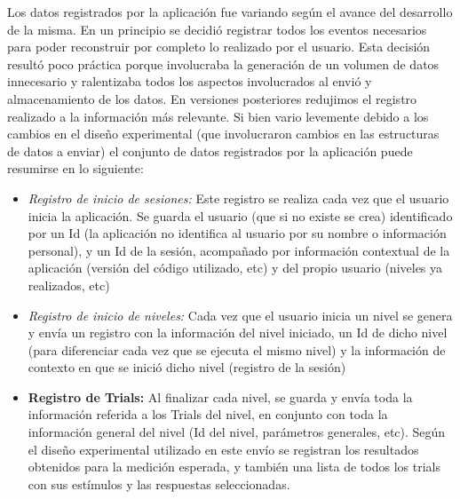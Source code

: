 \documentclass{article}
\begin{document}
    Los datos registrados por la aplicación fue variando según el avance del desarrollo de la misma. En un principio se decidió registrar todos los eventos necesarios para poder reconstruir por completo lo realizado por el usuario. Esta decisión resultó poco práctica porque involucraba la generación de un volumen de datos innecesario y ralentizaba todos los aspectos involucrados al envió y almacenamiento de los datos. 
    En versiones posteriores redujimos el registro realizado a la información más relevante. Si bien vario levemente debido a los cambios en el diseño experimental (que involucraron cambios en las estructuras de datos a enviar) el conjunto de datos registrados por la aplicación puede resumirse en lo siguiente:
    \begin{itemize}
        \item \textit{Registro de inicio de sesiones:} Este registro se realiza cada vez que el usuario inicia la aplicación. Se guarda el usuario (que si no existe se crea) identificado por un Id (la aplicación no identifica al usuario por su nombre o información personal), y un Id de la sesión, acompañado por información contextual de la aplicación (versión del código utilizado, etc) y del propio usuario (niveles ya realizados, etc)
        
        \item \textit{Registro de inicio de niveles:} Cada vez que el usuario inicia un nivel se genera y envía un registro con la información del nivel iniciado, un Id de dicho nivel (para diferenciar cada vez que se ejecuta el mismo nivel) y la información de contexto en que se inició dicho nivel (registro de la sesión)
        
        \item \textbf{Registro de Trials:} Al finalizar cada nivel, se guarda y envía toda la información referida a los Trials del nivel, en conjunto con toda la información general del nivel (Id del nivel, parámetros generales, etc). Según el diseño experimental utilizado en este envío se registran los resultados obtenidos para la medición esperada, y también una lista de todos los trials con sus estímulos y las respuestas seleccionadas. 
    \end{itemize}
    
\end{document}
